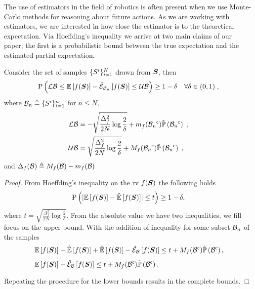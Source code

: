 The use of estimators in the field of robotics is often present when we use Monte-Carlo methods for reasoning about future actions. As we are working with estimators, we are interested in how close the estimator is to the theoretical expectation. Via Hoeffding's inequality we arrive at two main claims of our paper; the first is a probabilistic bound between the true expectation and the estimated partial expectation.

\begin{theorem}
	\label{thm:partial_hoeffding}
	Consider the set of samples $\{\variable^i\}_{i=1}^N$ drawn from $\RV$, then
	\begin{align*}
		\prob{\lowerbound\leq\expectation{f(\RV)}{}-\partialestimator{f(\RV)}{\subSpace_n}\leq\upperbound}\geq1-\delta&&\forall\delta\in(0,1)\;,
	\end{align*}
	where $\subSpace_n\triangleq\{\variable^i\}_{i=1}^n$ for $n\leq N$,
	\begin{subequations}
		\begin{align}
			\lowerbound & =-\sqrt{\frac{\Delta_f^2}{2N}\log\frac{2}{\delta}}+m_f(\stcomp{\subSpace_n})\estimatedmeasure{\stcomp{\subSpace_n}}\;, \\
			\upperbound & =\sqrt{\frac{\Delta_f^2}{2N}\log\frac{2}{\delta}}+M_f(\stcomp{\subSpace_n})\estimatedmeasure{\stcomp{\subSpace_n}}\;,
		\end{align}
	\end{subequations}
	and $\Delta_f(\subSpace)\triangleq M_f(\subSpace)-m_f(\subSpace)$
\end{theorem}
\begin{proof}
	From Hoeffding's inequality on the \gls{rv} $f(\RV)$ the following holds
	\begin{equation*}
		\prob{\abs{\expectation{f(\RV)}{}-\estimator{f(\RV)}{}}\leq t}\geq1-\delta,
	\end{equation*}
	where $t=\sqrt{\frac{\Delta_f^2}{2N}\log\frac{2}{\delta}}$. From the absolute value we have two inequalities, we fill focus on the upper bound.
	With the addition of inequality  for some subset $\subSpace_n$ of the samples
	\begin{align*}
		& \expectation{f(\RV)}{}-\estimator{f(\RV)}{}+\estimator{f(\RV)}{}-\partialestimator{f(\RV)}{\subSpace}\leq t+M_f(\stcomp{\subSpace})\estimatedmeasure{\stcomp{\subSpace}}, \\
		& \expectation{f(\RV)}{}-\partialestimator{f(\RV)}{\subSpace}\leq t+M_f(\stcomp{\subSpace})\estimatedmeasure{\stcomp{\subSpace}}.
	\end{align*}
	Repeating the procedure for the lower bounds results in the complete bounds.
\end{proof}

